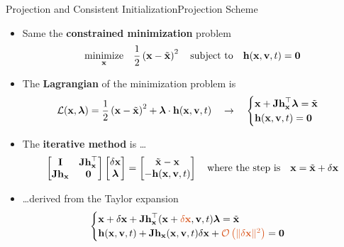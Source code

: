 \begin{frame}{Projection and Consistent Initialization}{Projection Scheme}
  \begin{itemize}
    \item Same the \textbf{constrained minimization} problem
    \begin{equation*}
      \underset{\mathbf{x}}{\text{minimize}} \quad \dfrac{1}{2}\left(\mathbf{x} - \tilde{\mathbf{x}}\right)^2 \quad \text{subject to} \quad \mathbf{h}(\mathbf{x}, \mathbf{v}, t) = \mathbf{0}
    \end{equation*}
    \item The \textbf{Lagrangian} of the minimization problem is
    \begin{equation*}
      \mathcal{L}(\mathbf{x}, \boldsymbol{\lambda}) = \frac{1}{2}\left(\mathbf{x} - \tilde{\mathbf{x}}\right)^2 + \boldsymbol{\lambda} \cdot \mathbf{h}(\mathbf{x}, \mathbf{v}, t)
      \quad \rightarrow \quad
      \begin{cases}
        \mathbf{x} + \mathbf{Jh}_{\mathbf{x}}^\top \boldsymbol{\lambda} = \tilde{\mathbf{x}} \\
        \mathbf{h}(\mathbf{x}, \mathbf{v}, t) = \mathbf{0}
      \end{cases}
    \end{equation*}
    \item The \textbf{iterative method} is \dots
    \begin{equation*}
      \begin{bmatrix}
        \mathbf{I}        & \mathbf{Jh}_{\mathbf{x}}^\top \\
        \mathbf{Jh}_{\mathbf{x}} & \mathbf{0}
      \end{bmatrix}
      \begin{bmatrix}
        \delta\mathbf{x} \\
        \boldsymbol{\lambda}
      \end{bmatrix} = \begin{bmatrix}
        \tilde{\mathbf{x}} - \mathbf{x} \\
        -\mathbf{h}(\mathbf{x}, \mathbf{v}, t)
      \end{bmatrix} \quad \text{where the step is} \quad \mathbf{x} = \tilde{\mathbf{x}} + \delta\mathbf{x}
    \end{equation*}
    \item[] \dots derived from the Taylor expansion
    \begin{equation*}
      \begin{cases}
        \mx + \delta\mx + \m{Jh}_{\mx}^{\top}(\mx + \textcolor{mycolor2}{\delta \mx}, \m{v}, t) \boldsymbol{\lambda} = \tilde{\mx} \\
        \mhv + \m{Jh}_{\mx}(\mx, \m{v}, t) \delta\mx + \textcolor{mycolor2}{\mathcal{O}\left(\| \delta\mx \|^2\right)} = \m{0}
      \end{cases}
    \end{equation*}
  \end{itemize}
\end{frame}

